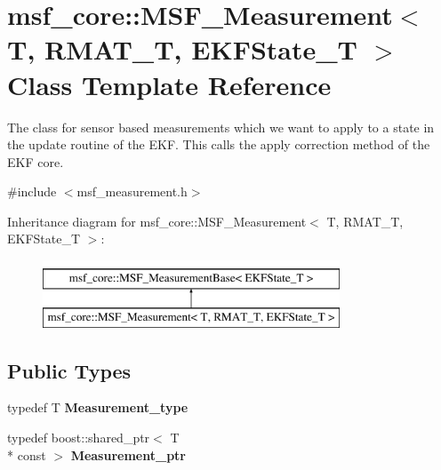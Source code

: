 \hypertarget{classmsf__core_1_1MSF__Measurement}{\section{msf\-\_\-core\-:\-:M\-S\-F\-\_\-\-Measurement$<$ T, R\-M\-A\-T\-\_\-\-T, E\-K\-F\-State\-\_\-\-T $>$ Class Template Reference}
\label{classmsf__core_1_1MSF__Measurement}
}


The class for sensor based measurements which we want to apply to a state in the update routine of the E\-K\-F. This calls the apply correction method of the E\-K\-F core.  




{\ttfamily \#include $<$msf\-\_\-measurement.\-h$>$}

Inheritance diagram for msf\-\_\-core\-:\-:M\-S\-F\-\_\-\-Measurement$<$ T, R\-M\-A\-T\-\_\-\-T, E\-K\-F\-State\-\_\-\-T $>$\-:\begin{figure}[H]
\begin{center}
\leavevmode
\includegraphics[height=2.000000cm]{classmsf__core_1_1MSF__Measurement}
\end{center}
\end{figure}
\subsection*{Public Types}
\begin{DoxyCompactItemize}
\item 
\hypertarget{classmsf__core_1_1MSF__Measurement_ab102d2c17bef09be28cb1403017992b6}{typedef T {\bfseries Measurement\-\_\-type}}\label{classmsf__core_1_1MSF__Measurement_ab102d2c17bef09be28cb1403017992b6}

\item 
\hypertarget{classmsf__core_1_1MSF__Measurement_afa4f826dadcfd129a50330f078a8dbf8}{typedef boost\-::shared\-\_\-ptr$<$ T \\*
const  $>$ {\bfseries Measurement\-\_\-ptr}}\label{classmsf__core_1_1MSF__Measurement_afa4f826dadcfd129a50330f078a8dbf8}

\end{DoxyCompactItemize}
